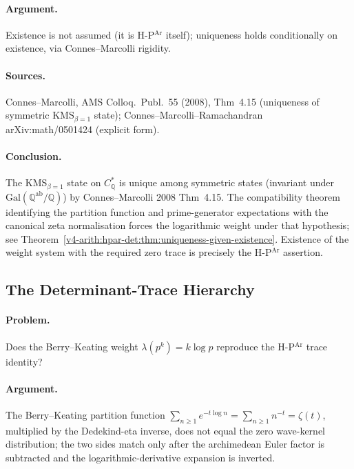 \paragraph{Argument.} Existence is not assumed (it is H-P\(^{\mathrm{Ar}}\)
itself); uniqueness holds conditionally on existence, via
Connes--Marcolli rigidity.

\paragraph{Sources.} Connes--Marcolli, AMS Colloq.~Publ.~55
(2008), Thm~4.15 (uniqueness of symmetric KMS\({}_{\beta=1}\) state);
Connes--Marcolli--Ramachandran arXiv:math/0501424 (explicit form).

\paragraph{Conclusion.} The KMS\({}_{\beta=1}\) state on
\(C^{*}_{\mathbb{Q}}\) is unique among symmetric states
(invariant under \(\mathrm{Gal}(\mathbb{Q}^{\mathrm{ab}}/\mathbb{Q})\))
by Connes--Marcolli 2008 Thm~4.15. The compatibility theorem
identifying the partition function and prime-generator expectations
with the canonical zeta normalisation forces the logarithmic weight
under that hypothesis; see
Theorem~\ref{v4-arith:hpar-det:thm:uniqueness-given-existence}. Existence
of the weight system with the required zero trace is precisely the
H-P\(^{\mathrm{Ar}}\) assertion.

\subsection{The Determinant-Trace Hierarchy}
\label{v4-arith:hpar-det:cycle-3}

\paragraph{Problem.} Does the Berry--Keating weight
\(\lambda(p^{k})=k\log p\) reproduce the H-P\(^{\mathrm{Ar}}\) trace
identity?

\paragraph{Argument.} The Berry--Keating partition function
\(\sum_{n\geq 1}e^{-t\log n}=\sum_{n\geq 1}n^{-t}=\zeta(t)\), multiplied
by the Dedekind-eta inverse, does not equal the zero
wave-kernel distribution;
the two sides match only after the archimedean Euler factor is
subtracted and the logarithmic-derivative expansion is inverted.

